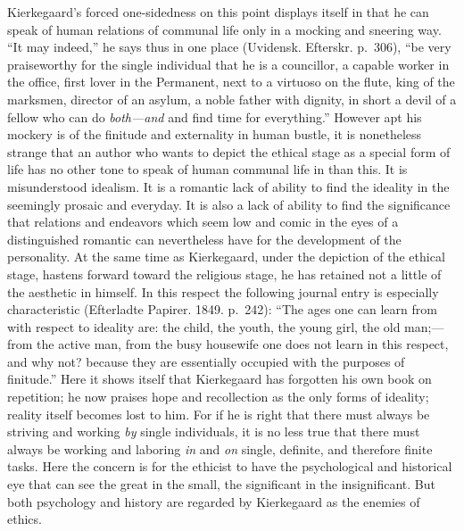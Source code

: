 \documentclass[12pt,a4paper]{book}
\newcommand{\opage}[1]{\marginnote{\footnotesize\textit{[#1]}}}
\begin{document}
Kierkegaard's forced one-sidedness on this point displays itself in that
he can speak of human relations of communal life only in a mocking and
sneering way. ``It may indeed,'' he says thus in one place
(Uvidensk. Efterskr. p.~306), ``be very praiseworthy for the single
individual that he is a councillor, a capable worker in the office, first
lover in the Permanent, next to a virtuoso on the flute, king of the
marksmen, director of an asylum, a noble father with dignity, in short a
devil of a fellow who can do \textit{both---and} and find time for
everything.'' However apt his mockery is of the finitude and externality
in human bustle, it is nonetheless strange that an author who wants to
depict the ethical stage as a special form of life has no other tone to
speak of human communal life in than this. It is misunderstood idealism.
It is a romantic lack of ability to find the ideality in the seemingly
prosaic and everyday. It is also a lack of ability to find the
significance that relations and endeavors which seem low and comic in the
eyes of a distinguished romantic can nevertheless have for the
development of the personality. At the same time as Kierkegaard, under the
depiction of the ethical stage, hastens forward toward the religious
stage, he has retained not a little of the aesthetic in himself. In this
respect the following journal entry is especially characteristic
(Efterladte Papirer. 1849. p.~242): ``The ages one can learn from with
respect to ideality are: the child, the youth, the young girl, the old
man;---from the active man, from the busy housewife
\opage{107}one does not learn in this respect, and why not? because they
are essentially occupied with the purposes of finitude.'' Here it shows
itself that Kierkegaard has forgotten his own book on repetition; he now
praises hope and recollection as the only forms of ideality; reality
itself becomes lost to him. For if he is right that there must always be
striving and working \textit{by} single individuals, it is no less true
that there must always be working and laboring \textit{in} and
\textit{on} single, definite, and therefore finite tasks. Here the concern
is for the ethicist to have the psychological and historical eye that can
see the great in the small, the significant in the insignificant. But both
psychology and history are regarded by Kierkegaard as the enemies of
ethics.
\end{document}
